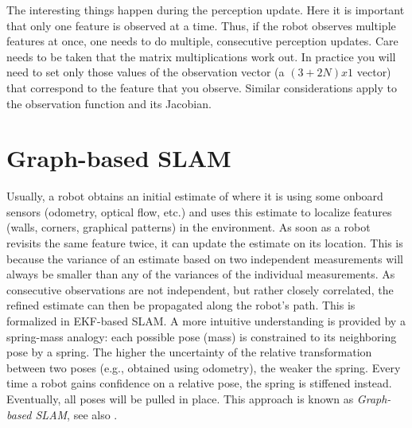 The interesting things happen during the perception update. Here it is important that only one feature is observed at a time. Thus, if the robot observes multiple features at once, one needs to do multiple, consecutive perception updates. Care needs to be taken that the matrix multiplications work out. In practice you will need to set only those values of the observation vector (a $(3+2N)x1$ vector) that correspond to the feature that you observe. Similar considerations apply to the observation function and its Jacobian.

\section{Graph-based SLAM}
Usually, a robot obtains an initial estimate of where it is using some onboard sensors (odometry, optical flow, etc.) and uses this estimate to localize features (walls, corners, graphical patterns) in the environment. As soon as a robot revisits the same feature twice, it can update the estimate on its location. This is because the variance of an estimate based on two independent measurements will always be smaller than any of the variances of the individual measurements. As consecutive observations are not independent, but rather closely correlated, the refined estimate can then be propagated along the robot's path. This is formalized in EKF-based SLAM. A more intuitive understanding is provided by a spring-mass analogy: each possible pose (mass) is constrained to its neighboring pose by a spring. The higher the uncertainty of the relative transformation between two poses (e.g., obtained using odometry), the weaker the spring. Every time a robot gains confidence on a relative pose, the spring is stiffened instead. Eventually, all poses will be pulled in place. This approach is known as \emph{Graph-based SLAM}, see also \cite{grisetti2010tutorial}. 

